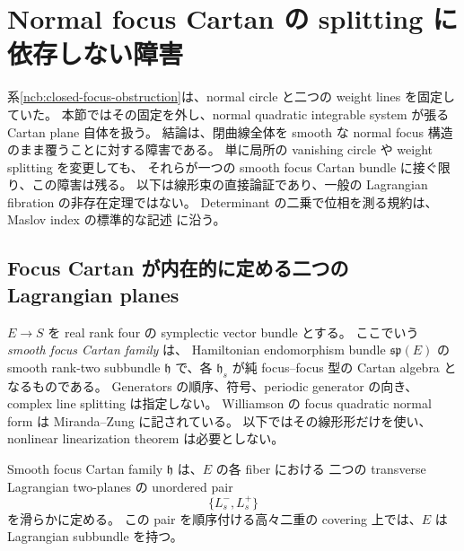 \section{Normal focus Cartan の splitting に依存しない障害}
\label{fnc:section}

系\ref{ncb:closed-focus-obstruction}は、normal circle と二つの weight lines を固定していた。
本節ではその固定を外し、normal quadratic integrable system が張る Cartan plane 自体を扱う。
結論は、閉曲線全体を smooth な normal focus 構造のまま覆うことに対する障害である。
単に局所の vanishing circle や weight splitting を変更しても、
それらが一つの smooth focus Cartan bundle に接ぐ限り、この障害は残る。
以下は線形束の直接論証であり、一般の Lagrangian fibration の非存在定理ではない。
Determinant の二乗で位相を測る規約は、Maslov index の標準的な記述
\cite[Sections 2.3 and 3.1]{cho-shin-maslov}に沿う。

\subsection{Focus Cartan が内在的に定める二つの Lagrangian planes}

$E\to S$ を real rank four の symplectic vector bundle とする。
ここでいう \emph{smooth focus Cartan family} は、
Hamiltonian endomorphism bundle $\mathfrak{sp}(E)$ の smooth rank-two subbundle
$\mathfrak h$ で、各 $\mathfrak h_s$ が純 focus--focus 型の Cartan algebra となるものである。
Generators の順序、符号、periodic generator の向き、complex line splitting は指定しない。
Williamson の focus quadratic normal form は
Miranda--Zung \cite[Section 2.3, formula (2.3)]{miranda-local}に記されている。
以下ではその線形形だけを使い、nonlinear linearization theorem は必要としない。

\begin{lemma}\label{fnc:stable-pair}
Smooth focus Cartan family $\mathfrak h$ は、$E$ の各 fiber における
二つの transverse Lagrangian two-planes の unordered pair
\[
 \{L_s^-,L_s^+\}
\]
を滑らかに定める。
この pair を順序付ける高々二重の covering 上では、$E$ は Lagrangian subbundle を持つ。
\end{lemma}

